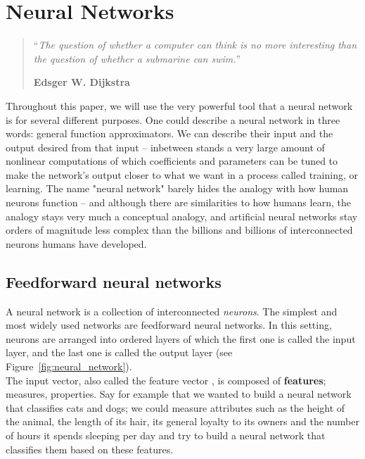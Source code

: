 \chapter{Neural Networks}
\begin{quotation}
\noindent ``\emph{The question of whether a computer can think is no more 
	interesting than the question of whether a submarine can swim.}''
\begin{flushright}\textbf{Edsger W. Dijkstra}\end{flushright}
\end{quotation}

\vspace*{0.5cm}

Throughout this paper, we will use the very powerful tool that a neural network
is for several different purposes. One could describe a neural network in 
three words: general function approximators. We can describe their input
and the output desired from that input -- inbetween stands a very large amount of
nonlinear computations of which coefficients and parameters can be tuned to
make the network's output closer to what we want in a process called training, 
or learning. The name "neural network"
barely hides the analogy with how human neurons function -- and although there
are similarities to how humans learn, the analogy stays very much a conceptual
analogy, and artificial neural networks stay orders of magnitude less complex
than the billions and billions of interconnected neurons humans have developed. 

\section{Feedforward neural networks}
A neural network is a collection of interconnected \textit{neurons}. The
simplest and most widely used networks are feedforward neural networks. In this
setting, neurons are arranged into ordered layers of which the first one is
called the input layer, and the last one is called the output layer
(see Figure~\ref{fig:neural_network}).\\

The input vector, also called the feature vector ,
is composed of \textbf{features}; measures, properties. Say
for example that we wanted to build a neural network that classifies cats and
dogs; we could measure attributes such as the height of the animal, the length
of its hair, its general loyalty to its owners and the number of hours it 
spends sleeping per day and try to build a neural network that classifies
them based on these features.\\

